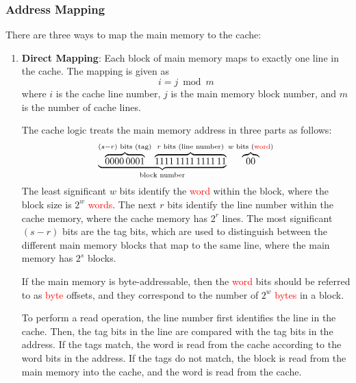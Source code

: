\subsubsection{Address Mapping}

There are three ways to map the main memory to the cache:
\begin{enumerate}
\item \textbf{Direct Mapping}: 
    Each block of main memory maps to exactly one line in the cache. The mapping is
    given as 
    \[i = j \bmod m\]
    where $i$ is the cache line number, $j$ is the main memory
    block number, and $m$ is the number of cache lines.
    
    \begin{example}
        The cache logic treats the main memory address in three parts as follows:
        \begin{equation*}
            \underbrace{
            \overbrace{0000\,0001}^{(s-r)\text{ bits (tag)}}\,
            \overbrace{1111\,1111\,1111\,11}^{r\text{ bits (line number)}}}
            _{\text{block number}}
            \overbrace{00}^{w\text{ bits (\textcolor{red}{word})}}
        \end{equation*}
        The least significant $w$ bits identify the \textcolor{red}{word} within the block,
        where the block size is $2^w$ \textcolor{red}{words}. The next $r$ bits identify the line
        number within the cache memory, where the cache memory has $2^r$ lines.
        The most significant $(s-r)$ bits are the tag bits, which are used to
        distinguish between the different main memory blocks that map to the same line,
        where the main memory has $2^s$ blocks.

        \begin{remark}
        If the main memory is byte-addressable, then the \textcolor{red}{word} bits should
        be referred to as \textcolor{red}{byte} offsets, and they correspond to the number
        of $2^w$ \textcolor{red}{bytes} in a block.
        \end{remark}
    \end{example}

    To perform a read operation, the line number first identifies the line in the cache.
    Then, the tag bits in the line are compared with the tag bits in the address.
    If the tags match, the word is read from the cache according to the word bits in the
    address. If the tags do not match, the block is read from the main memory into the
    cache, and the word is read from the cache.


\end{enumerate}
